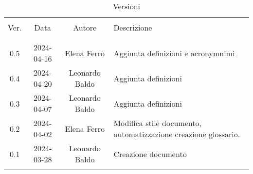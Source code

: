 \documentclass[italian,12pt]{article}
\begin{document}


\newpage



\begin{table}[!h]
	\caption{Versioni}
	\begin{center}
		\begin{tabular}{ c c c p{9cm} }
			\hline                                                                                               \\[-2ex]
			Ver. & Data       & Autore         & Descrizione                                                     \\
			\\[-2ex] \hline \\[-1.5ex]
			0.5  & 2024-04-16 & Elena Ferro    & Aggiunta definizioni e acronymnimi                              \\
			0.4  & 2024-04-20 & Leonardo Baldo & Aggiunta definizioni                                            \\
			0.3  & 2024-04-07 & Leonardo Baldo & Aggiunta definizioni                                            \\
			0.2  & 2024-04-02 & Elena Ferro    & Modifica stile documento, automatizzazione creazione glossario. \\
			0.1  & 2024-03-28 & Leonardo Baldo & Creazione documento                                             \\
			\\[-1.5ex] \hline
		\end{tabular}
	\end{center}
\end{table}

\newpage
\tableofcontents
\printglossary[style=myaltlistgroup,title=]
\end{document}

